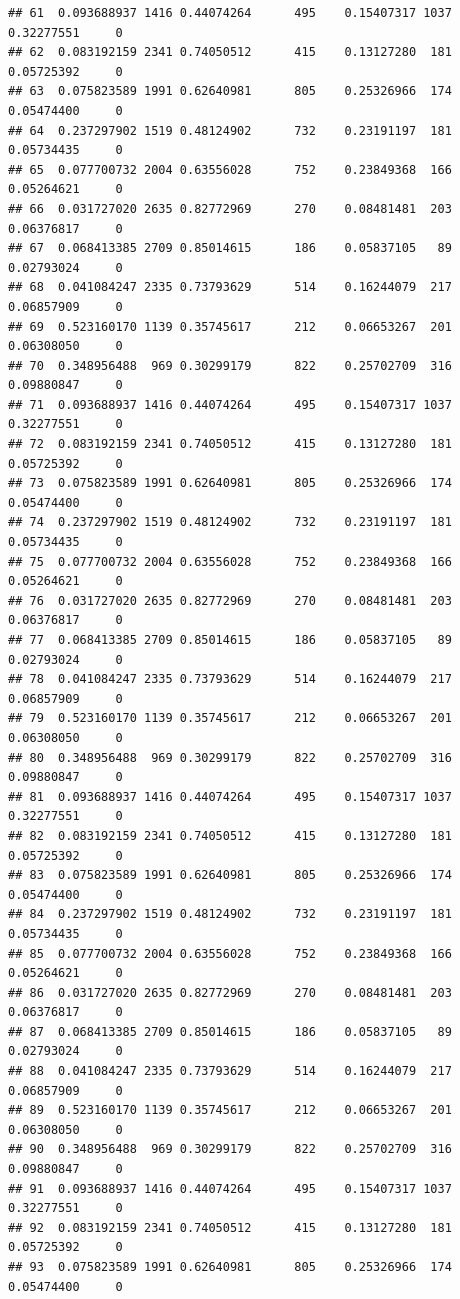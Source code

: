 \documentclass[
]{article}
\begin{document}
\begin{verbatim}
## 61  0.093688937 1416 0.44074264      495    0.15407317 1037 0.32277551     0
## 62  0.083192159 2341 0.74050512      415    0.13127280  181 0.05725392     0
## 63  0.075823589 1991 0.62640981      805    0.25326966  174 0.05474400     0
## 64  0.237297902 1519 0.48124902      732    0.23191197  181 0.05734435     0
## 65  0.077700732 2004 0.63556028      752    0.23849368  166 0.05264621     0
## 66  0.031727020 2635 0.82772969      270    0.08481481  203 0.06376817     0
## 67  0.068413385 2709 0.85014615      186    0.05837105   89 0.02793024     0
## 68  0.041084247 2335 0.73793629      514    0.16244079  217 0.06857909     0
## 69  0.523160170 1139 0.35745617      212    0.06653267  201 0.06308050     0
## 70  0.348956488  969 0.30299179      822    0.25702709  316 0.09880847     0
## 71  0.093688937 1416 0.44074264      495    0.15407317 1037 0.32277551     0
## 72  0.083192159 2341 0.74050512      415    0.13127280  181 0.05725392     0
## 73  0.075823589 1991 0.62640981      805    0.25326966  174 0.05474400     0
## 74  0.237297902 1519 0.48124902      732    0.23191197  181 0.05734435     0
## 75  0.077700732 2004 0.63556028      752    0.23849368  166 0.05264621     0
## 76  0.031727020 2635 0.82772969      270    0.08481481  203 0.06376817     0
## 77  0.068413385 2709 0.85014615      186    0.05837105   89 0.02793024     0
## 78  0.041084247 2335 0.73793629      514    0.16244079  217 0.06857909     0
## 79  0.523160170 1139 0.35745617      212    0.06653267  201 0.06308050     0
## 80  0.348956488  969 0.30299179      822    0.25702709  316 0.09880847     0
## 81  0.093688937 1416 0.44074264      495    0.15407317 1037 0.32277551     0
## 82  0.083192159 2341 0.74050512      415    0.13127280  181 0.05725392     0
## 83  0.075823589 1991 0.62640981      805    0.25326966  174 0.05474400     0
## 84  0.237297902 1519 0.48124902      732    0.23191197  181 0.05734435     0
## 85  0.077700732 2004 0.63556028      752    0.23849368  166 0.05264621     0
## 86  0.031727020 2635 0.82772969      270    0.08481481  203 0.06376817     0
## 87  0.068413385 2709 0.85014615      186    0.05837105   89 0.02793024     0
## 88  0.041084247 2335 0.73793629      514    0.16244079  217 0.06857909     0
## 89  0.523160170 1139 0.35745617      212    0.06653267  201 0.06308050     0
## 90  0.348956488  969 0.30299179      822    0.25702709  316 0.09880847     0
## 91  0.093688937 1416 0.44074264      495    0.15407317 1037 0.32277551     0
## 92  0.083192159 2341 0.74050512      415    0.13127280  181 0.05725392     0
## 93  0.075823589 1991 0.62640981      805    0.25326966  174 0.05474400     0

\end{verbatim}
\end{document}
